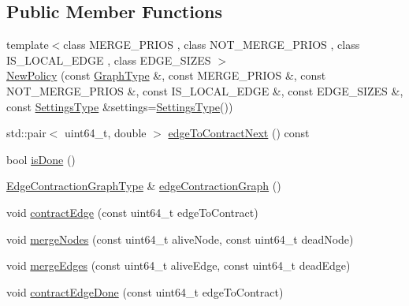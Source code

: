 \subsection*{Public Member Functions}
\begin{DoxyCompactItemize}
\item 
{\footnotesize template$<$class M\+E\+R\+G\+E\+\_\+\+P\+R\+I\+OS , class N\+O\+T\+\_\+\+M\+E\+R\+G\+E\+\_\+\+P\+R\+I\+OS , class I\+S\+\_\+\+L\+O\+C\+A\+L\+\_\+\+E\+D\+GE , class E\+D\+G\+E\+\_\+\+S\+I\+Z\+ES $>$ }\\\hyperlink{classnifty_1_1graph_1_1agglo_1_1NewPolicy_abb73c71b6c9fd8038e323a56161cd52d}{New\+Policy} (const \hyperlink{classnifty_1_1graph_1_1agglo_1_1NewPolicy_ac8758b09604128d2bded40975109e808}{Graph\+Type} \&, const M\+E\+R\+G\+E\+\_\+\+P\+R\+I\+OS \&, const N\+O\+T\+\_\+\+M\+E\+R\+G\+E\+\_\+\+P\+R\+I\+OS \&, const I\+S\+\_\+\+L\+O\+C\+A\+L\+\_\+\+E\+D\+GE \&, const E\+D\+G\+E\+\_\+\+S\+I\+Z\+ES \&, const \hyperlink{structnifty_1_1graph_1_1agglo_1_1NewPolicy_1_1SettingsType}{Settings\+Type} \&settings=\hyperlink{structnifty_1_1graph_1_1agglo_1_1NewPolicy_1_1SettingsType}{Settings\+Type}())
\item 
std\+::pair$<$ uint64\+\_\+t, double $>$ \hyperlink{classnifty_1_1graph_1_1agglo_1_1NewPolicy_a81e86b1d68aaf96fec449c9663ba7b54}{edge\+To\+Contract\+Next} () const
\item 
bool \hyperlink{classnifty_1_1graph_1_1agglo_1_1NewPolicy_adb2e0454a5fdd281efd72ef5f049c482}{is\+Done} ()
\item 
\hyperlink{classnifty_1_1graph_1_1agglo_1_1NewPolicy_a704192e6cafc4bfba6071564ea52e17c}{Edge\+Contraction\+Graph\+Type} \& \hyperlink{classnifty_1_1graph_1_1agglo_1_1NewPolicy_a146805a200532c83f0c1f0bcf66287e1}{edge\+Contraction\+Graph} ()
\item 
void \hyperlink{classnifty_1_1graph_1_1agglo_1_1NewPolicy_a7fa5fce0d956a2d35707d6cf66dac566}{contract\+Edge} (const uint64\+\_\+t edge\+To\+Contract)
\item 
void \hyperlink{classnifty_1_1graph_1_1agglo_1_1NewPolicy_a522b44525f9dfd9cd68c97c1e5626cec}{merge\+Nodes} (const uint64\+\_\+t alive\+Node, const uint64\+\_\+t dead\+Node)
\item 
void \hyperlink{classnifty_1_1graph_1_1agglo_1_1NewPolicy_a775d22ce7efed5178d851e5ffded73c9}{merge\+Edges} (const uint64\+\_\+t alive\+Edge, const uint64\+\_\+t dead\+Edge)
\item 
void \hyperlink{classnifty_1_1graph_1_1agglo_1_1NewPolicy_aed38fddcff9c9f1be261bcd4e548fad1}{contract\+Edge\+Done} (const uint64\+\_\+t edge\+To\+Contract)

\end{DoxyCompactItemize}
